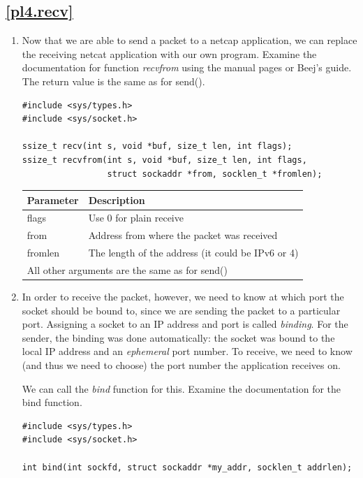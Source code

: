 \documentclass[12pt]{book}
\begin{document}
\subsection{\ref{pl4.recv}}

\begin{enumerate}[resume*]
\item Now that we are able to send a packet to a netcap application, we can replace the receiving netcat application with our own program. Examine the documentation for function \emph{recvfrom} using the manual pages or Beej's guide. The return value is the same as for send().

  \begin{lstlisting}
#include <sys/types.h>
#include <sys/socket.h>

ssize_t recv(int s, void *buf, size_t len, int flags);
ssize_t recvfrom(int s, void *buf, size_t len, int flags,
                 struct sockaddr *from, socklen_t *fromlen);  
  \end{lstlisting}

  \begin{tabular}{l p{10cm}}
    \toprule
    Parameter & Description \\
    \midrule
    flags & Use 0 for plain receive \\
    from & Address from where the packet was received \\
    fromlen & The length of the address (it could be IPv6 or 4)\\
    \multicolumn{2}{l}{All other arguments are the same as for send()} \\
    \bottomrule
  \end{tabular}
  
\item In order to receive the packet, however, we need to know at which port the socket should be bound to, since we are sending the packet to a particular port. Assigning a socket to an IP address and port is called \emph{binding}. For the sender, the binding was done automatically: the socket was bound to the local IP address and an \emph{ephemeral} port number. To receive, we need to know (and thus we need to choose) the port number the application receives on.

  We can call the \emph{bind} function for this. Examine the documentation for the bind function.

  \begin{lstlisting}
#include <sys/types.h>
#include <sys/socket.h>

int bind(int sockfd, struct sockaddr *my_addr, socklen_t addrlen);    
  \end{lstlisting}


\end{enumerate}
\end{document}
